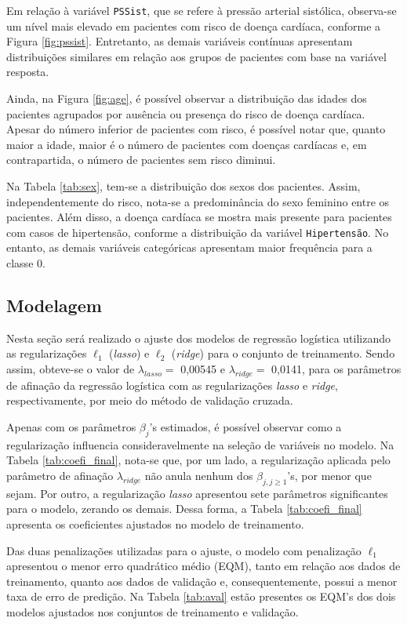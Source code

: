 \documentclass[
  12pt,
]{article}
\begin{document}
\quad Em relação à variável \texttt{PSSist}, que se refere à pressão
arterial sistólica, observa-se um nível mais elevado em pacientes com
risco de doença cardíaca, conforme a Figura \ref{fig:pssist}.
Entretanto, as demais variáveis contínuas apresentam distribuições
similares em relação aos grupos de pacientes com base na variável
resposta.

\quad Ainda, na Figura \ref{fig:age}, é possível observar a distribuição
das idades dos pacientes agrupados por ausência ou presença do risco de
doença cardíaca. Apesar do número inferior de pacientes com risco, é
possível notar que, quanto maior a idade, maior é o número de pacientes
com doenças cardíacas e, em contrapartida, o número de pacientes sem
risco diminui.

\quad Na Tabela \ref{tab:sex}, tem-se a distribuição dos sexos dos
pacientes. Assim, independentemente do risco, nota-se a predominância do
sexo feminino entre os pacientes. Além disso, a doença cardíaca se
mostra mais presente para pacientes com casos de hipertensão, conforme a
distribuição da variável \texttt{Hipertensão}. No entanto, as demais
variáveis categóricas apresentam maior frequência para a classe \(0\).

\subsection{Modelagem}

\quad Nesta seção será realizado o ajuste dos modelos de regressão
logística utilizando as regularizações \(\ell_1\) (\emph{lasso}) e
\(\ell_2\) (\emph{ridge}) para o conjunto de treinamento. Sendo assim,
obteve-se o valor de \(\lambda_{lasso}=\) 0,00545 e
\(\lambda_{ridge} =\) 0,0141, para os parâmetros de afinação da
regressão logística com as regularizações \emph{lasso} e \emph{ridge},
respectivamente, por meio do método de validação cruzada.

\quad Apenas com os parâmetros \(\beta_j\)'s estimados, é possível
observar como a regularização influencia consideravelmente na seleção de
variáveis no modelo. Na Tabela \ref{tab:coefi_final}, nota-se que, por
um lado, a regularização aplicada pelo parâmetro de afinação
\(\lambda_{ridge}\) não anula nenhum dos \(\beta_{j, j \geq 1}\)'s, por
menor que sejam. Por outro, a regularização \emph{lasso} apresentou sete
parâmetros significantes para o modelo, zerando os demais. Dessa forma,
a Tabela \ref{tab:coefi_final} apresenta os coeficientes ajustados no
modelo de treinamento.

\quad Das duas penalizações utilizadas para o ajuste, o modelo com
penalização \(\ell_1\) apresentou o menor erro quadrático médio (EQM),
tanto em relação aos dados de treinamento, quanto aos dados de validação
e, consequentemente, possui a menor taxa de erro de predição. Na Tabela
\ref{tab:aval} estão presentes os EQM's dos dois modelos ajustados nos
conjuntos de treinamento e validação.
\end{document}
